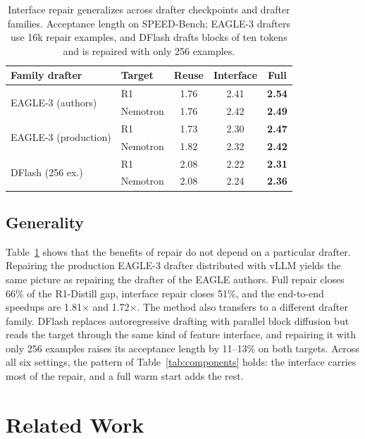 \documentclass[11pt]{article}
\newcommand{\Ours}{Interface repair}
\begin{document}
\begin{table}[t]
  \centering
  \small
  \setlength{\tabcolsep}{3.4pt}
  \begin{tabular}{@{}llccc@{}}
    \toprule
    Family drafter & Target & Reuse & Interface & Full \\
    \midrule
    \multirow{2}{*}{EAGLE-3 (authors)} & R1 & 1.76 & 2.41 & \textbf{2.54} \\
                                 & Nemotron & 1.76 & 2.42 & \textbf{2.49} \\
    \multirow{2}{*}{EAGLE-3 (production)} & R1 & 1.73 & 2.30 & \textbf{2.47} \\
                                 & Nemotron & 1.82 & 2.32 & \textbf{2.42} \\
    \multirow{2}{*}{DFlash (256 ex.)} & R1 & 2.08 & 2.22 & \textbf{2.31} \\
                                 & Nemotron & 2.08 & 2.24 & \textbf{2.36} \\
    \bottomrule
  \end{tabular}
  \caption{\Ours{} generalizes across drafter checkpoints and drafter families. Acceptance length on SPEED-Bench; EAGLE-3 drafters use 16k repair examples, and DFlash drafts blocks of ten tokens and is repaired with only 256 examples.}
  \label{tab:robustness}
\end{table}

\subsection{Generality}

Table~\ref{tab:robustness} shows that the benefits of repair do not depend on a particular drafter.
Repairing the production EAGLE-3 drafter distributed with vLLM yields the same picture as repairing the drafter of the EAGLE authors.
Full repair closes 66\% of the R1-Distill gap, interface repair closes 51\%, and the end-to-end speedups are 1.81$\times$ and 1.72$\times$.
The method also transfers to a different drafter family.
DFlash replaces autoregressive drafting with parallel block diffusion but reads the target through the same kind of feature interface, and repairing it with only 256 examples raises its acceptance length by 11--13\% on both targets.
Across all six settings, the pattern of Table~\ref{tab:components} holds: the interface carries most of the repair, and a full warm start adds the rest.

\section{Related Work}
\label{sec:related}
\end{document}
